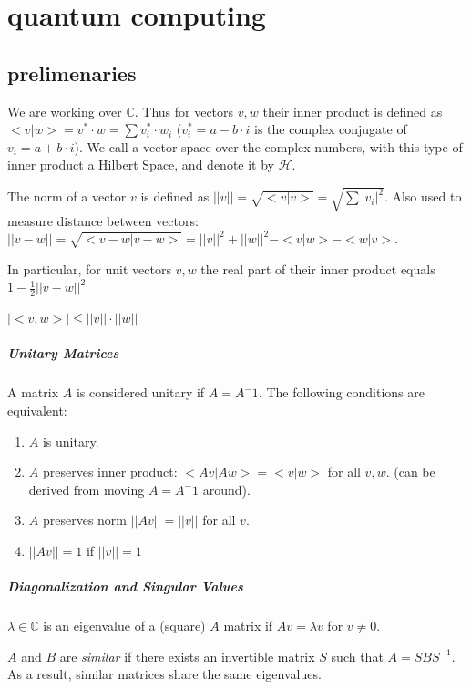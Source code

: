 \chapter{quantum computing}
\section{prelimenaries}
We are working over $\mathbb{C}$. Thus for vectors $v,w$ their inner product is defined as $<v|w>=v^*\cdot w=\sum v_i^*\cdot w_i$ ($v_i^*=a-b\cdot i$ is the complex conjugate of $v_i=a+b\cdot i$). We call a vector space over the complex numbers, with this type of inner product a Hilbert Space, and denote it by $\mathcal{H}$.

The norm of a vector $v$ is defined as $||v||=\sqrt{<v|v>}=\sqrt{\sum |v_i|^2}$. 
Also used to measure distance between vectors: $||v-w||=\sqrt{<v-w|v-w>}=||v||^2+||w||^2-<v|w>-<w|v>$.

In particular, for unit vectors $v,w$ the real part of their inner product equals $1-\frac{1}{2}||v-w||^2$

\begin{theorem}
    $|<v,w>| \leq ||v||\cdot ||w||$
\end{theorem}


\paragraph{Unitary Matrices}
A matrix $A$ is considered unitary if $A=A^-1$. The following conditions are equivalent:
\begin{enumerate}
    \item $A$ is unitary.
    \item $A$ preserves inner product: $<Av|Aw>=<v|w>$ for all $v,w$. (can be derived from moving $A=A^-1$ around).
    \item $A$ preserves norm $||Av||=||v||$ for all $v$.
    \item $||Av||=1$ if $||v||=1$
\end{enumerate}

\paragraph{Diagonalization and Singular Values}
$\lambda\in\mathbb{C}$ is an eigenvalue of a (square) $A$ matrix if $Av=\lambda v$ for $v\neq 0$.


$A$ and $B$ are \emph{similar} if there exists an invertible matrix $S$ such that $A=SBS^{-1}$. As a result, similar matrices share the same eigenvalues.

